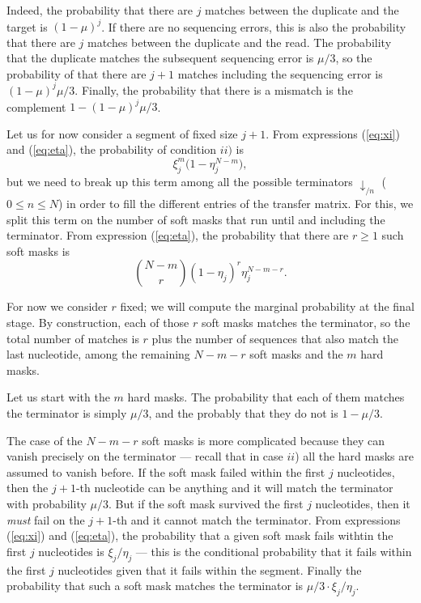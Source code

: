 \documentclass{article}
\begin{document}
Indeed, the probability that there are $j$ matches between the duplicate
and the target is $(1-\mu)^j$. If there are no sequencing errors, this is
also the probability that there are $j$ matches between the duplicate and
the read. The probability that the duplicate matches the subsequent
sequencing error is $\mu/3$, so the probability of that there are $j+1$
matches including the sequencing error is $(1-\mu)^j\mu/3$. Finally, the
probability that there is a mismatch is the complement $1-(1-\mu)^j\mu/3$.

Let us for now consider a segment of fixed size $j+1$. From expressions
(\ref{eq:xi}) and (\ref{eq:eta}), the probability of condition $ii)$ is
\begin{equation*}
\xi_j^m \Big(1 - \eta_j^{N-m} \Big),
\end{equation*}
but we need to break up this term among all the possible terminators
$\downarrow_{/n}$ ($0 \leq n \leq N$) in order to fill the different
entries of the transfer matrix. For this, we split this term on the number
of soft masks that run until and including the terminator. From expression
(\ref{eq:eta}), the probability that there are $r \geq 1$ such soft masks
is
\begin{equation}
\label{eq:softmasks_r}
{N-m \choose r} (1 - \eta_j)^r \eta_j^{N-m-r}.
\end{equation}

For now we consider $r$ fixed; we will compute the marginal probability at
the final stage. By construction, each of those $r$ soft masks matches the
terminator, so the total number of matches is $r$ plus the number of
sequences that also match the last nucleotide, among the remaining $N-m-r$
soft masks and the $m$ hard masks.

Let us start with the $m$ hard masks. The probability that each of them
matches the terminator is simply $\mu/3$, and the probably that they do
not is $1-\mu/3$.

The case of the $N-m-r$ soft masks is more complicated because they can
vanish precisely on the terminator --- recall that in case $ii$) all the
hard masks are assumed to vanish before. If the soft mask failed within
the first $j$ nucleotides, then the $j+1$-th nucleotide can be anything
and it will match the terminator with probability $\mu/3$. But if the soft
mask survived the first $j$ nucleotides, then it \emph{must} fail on the
$j+1$-th and it cannot match the terminator. From expressions
(\ref{eq:xi}) and (\ref{eq:eta}), the probability that a given soft mask
fails withtin the first $j$ nucleotides is $\xi_j/\eta_j$ --- this is the
conditional probability that it fails within the first $j$ nucleotides
given that it fails within the segment. Finally the probability that such
a soft mask matches the terminator is $\mu/3 \cdot \xi_j / \eta_j$.
\end{document}
